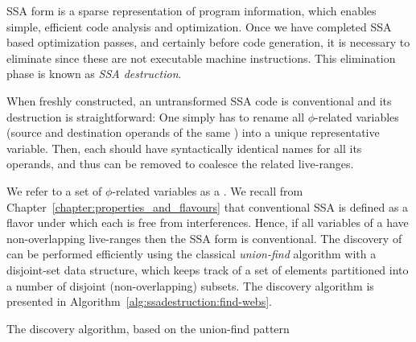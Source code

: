 {SSA form is a sparse representation of program information, which enables simple, efficient code analysis and optimization. 
Once we have completed SSA based optimization passes, and certainly before code generation, it is necessary to eliminate \phifuns since these are not executable machine instructions. 
This elimination phase is known as \textit{SSA destruction}.

When freshly constructed, an untransformed SSA code is conventional and its destruction is straightforward: One simply has to rename all $\phi$-related variables (source and destination operands of the same \phifun) into a unique representative variable. 
Then, each \phifun should have syntactically identical names for all its operands, and thus can be removed to coalesce the related live-ranges.

We refer to a set of $\phi$-related variables as a \phiweb.\index{\phiweb} We recall from Chapter~\ref{chapter:properties_and_flavours} that conventional SSA is defined as a flavor under which each \phiweb is free from interferences. 
Hence, if all variables of a \phiweb{} have non-overlapping live-ranges then the SSA form is conventional. 
The discovery of \phiwebs can be performed efficiently using the classical \textit{union-find} algorithm with a disjoint-set data structure, which keeps track of a set of elements partitioned into a number of disjoint (non-overlapping) subsets. 
The \phiwebs discovery algorithm is presented in Algorithm~\ref{alg:ssadestruction:find-webs}.

\begin{algorithm}
\caption{\label{alg:ssadestruction:find-webs}The \phiwebs discovery algorithm, based on the union-find pattern}
\end{algorithm}


}
